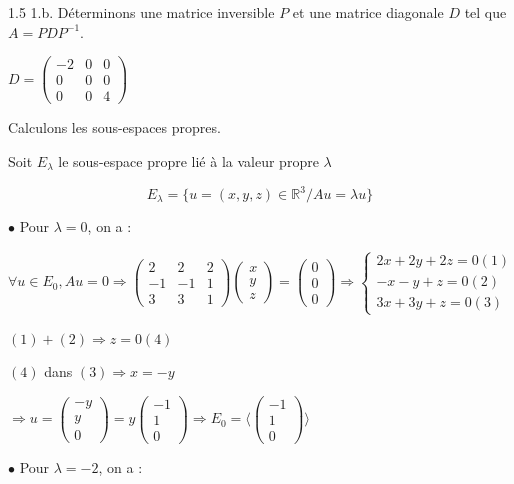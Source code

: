 \documentclass[12pt]{article}
\begin{document}
\begin{spacing}{1.5}
1.b. Déterminons une matrice inversible $P$ et une matrice diagonale $D$ tel que $A=PDP^{-1}$.

$D=\begin{pmatrix}
-2 & 0& 0 \\ 
0 & 0 & 0 \\ 
0 & 0 & 4
\end{pmatrix}$

Calculons les sous-espaces propres.

Soit $E_\lambda$ le sous-espace propre lié à la valeur propre $\lambda$

\[
E_\lambda=\{u=(x,y,z)\in \mathbb{R}^3/Au=\lambda u\}
\]

\medskip
$\bullet$ Pour $\lambda=0$, on a :

$\forall u\in E_0,Au=0\Rightarrow \begin{pmatrix}
2 & 2& 2 \\ 
-1 & -1 & 1 \\ 
3 & 3 & 1
\end{pmatrix}\begin{pmatrix}
x\\
y\\
z
\end{pmatrix}=\begin{pmatrix}
0\\
0\\
0
\end{pmatrix}\Rightarrow \begin{cases}
2x+2y+2z=0(1)\\
-x-y+z=0(2)\\
3x+3y+z=0(3)
\end{cases}$

$(1)+(2)\Longrightarrow z=0 (4)$

$(4)$ dans $(3)\Longrightarrow x=-y$

$\Rightarrow u=\begin{pmatrix}
-y\\
y\\
0
\end{pmatrix}=y\begin{pmatrix}
-1\\
1  \\
0
\end{pmatrix}\Rightarrow E_0=\langle \begin{pmatrix}
-1\\
1\\
0
\end{pmatrix}\rangle$

$\bullet$ Pour $\lambda=-2$, on a :


\end{spacing}
\end{document}
